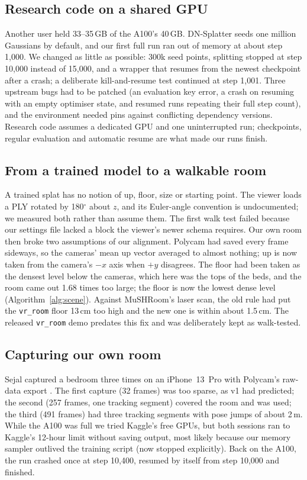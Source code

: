 \subsection{Research code on a shared GPU}
Another user held 33--35\,GB of the A100's 40\,GB. DN-Splatter seeds one million Gaussians by default, and our first full run ran out of memory at about step 1,000. We changed as little as possible: 300k seed points, splitting stopped at step 10,000 instead of 15,000, and a wrapper that resumes from the newest checkpoint after a crash; a deliberate kill-and-resume test continued at step 1,001. Three upstream bugs had to be patched (an evaluation key error, a crash on resuming with an empty optimiser state, and resumed runs repeating their full step count), and the environment needed pins against conflicting dependency versions. Research code assumes a dedicated GPU and one uninterrupted run; checkpoints, regular evaluation and automatic resume are what made our runs finish.

\subsection{From a trained model to a walkable room}
A trained splat has no notion of up, floor, size or starting point. The viewer loads a PLY rotated by 180$^\circ$ about $z$, and its Euler-angle convention is undocumented; we measured both rather than assume them. The first walk test failed because our settings file lacked a block the viewer's newer schema requires. Our own room then broke two assumptions of our alignment. Polycam had saved every frame sideways, so the cameras' mean up vector averaged to almost nothing; up is now taken from the camera's $-x$ axis when $+y$ disagrees. The floor had been taken as the densest level below the cameras, which here was the tops of the beds, and the room came out 1.68 times too large; the floor is now the lowest dense level (Algorithm~\ref{alg:scene}). Against MuSHRoom's laser scan, the old rule had put the \texttt{vr\_room} floor 13\,cm too high and the new one is within about 1.5\,cm. The released \texttt{vr\_room} demo predates this fix and was deliberately kept as walk-tested.

\subsection{Capturing our own room}
Sejal captured a bedroom three times on an iPhone~13~Pro with Polycam's raw-data export \cite{polycam}. The first capture (32 frames) was too sparse, as v1 had predicted; the second (257 frames, one tracking segment) covered the room and was used; the third (491 frames) had three tracking segments with pose jumps of about 2\,m. While the A100 was full we tried Kaggle's free GPUs, but both sessions ran to Kaggle's 12-hour limit without saving output, most likely because our memory sampler outlived the training script (now stopped explicitly). Back on the A100, the run crashed once at step 10,400, resumed by itself from step 10,000 and finished.


